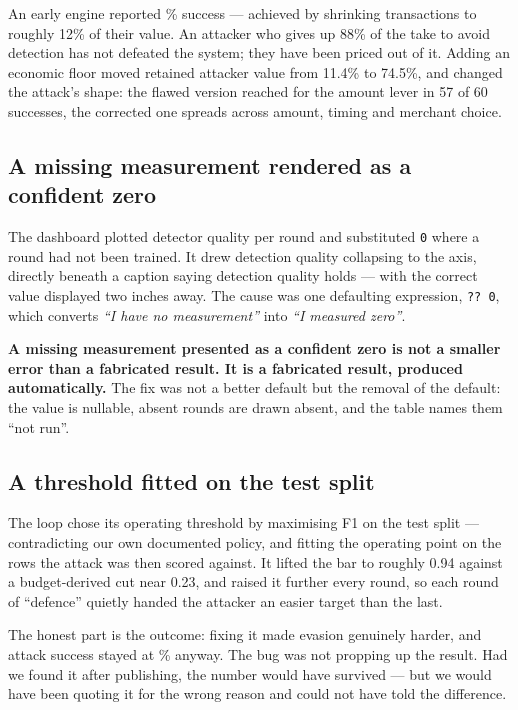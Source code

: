 \documentclass[11pt,a4paper]{article}
\newcommand{\claim}[1]{\textcolor{attack}{\textbf{#1}}}
\begin{document}
An early engine reported \AsrLast\% success --- achieved by shrinking transactions to roughly
12\% of their value. An attacker who gives up 88\% of the take to avoid detection has not
defeated the system; they have been priced out of it. Adding an economic floor moved
retained attacker value from 11.4\% to 74.5\%, and changed the attack's shape: the flawed
version reached for the amount lever in 57 of 60 successes, the corrected one spreads across
amount, timing and merchant choice.

\subsection{A missing measurement rendered as a confident zero}

The dashboard plotted detector quality per round and substituted \texttt{0} where a round had
not been trained. It drew detection quality collapsing to the axis, directly beneath a caption
saying detection quality holds --- with the correct value displayed two inches away. The cause
was one defaulting expression, \texttt{?? 0}, which converts \emph{``I have no measurement''}
into \emph{``I measured zero''}.

\claim{A missing measurement presented as a confident zero is not a smaller error than a
fabricated result. It is a fabricated result, produced automatically.} The fix was not a
better default but the removal of the default: the value is nullable, absent rounds are drawn
absent, and the table names them ``not run''.

\subsection{A threshold fitted on the test split}

The loop chose its operating threshold by maximising F1 on the test split --- contradicting
our own documented policy, and fitting the operating point on the rows the attack was then
scored against. It lifted the bar to roughly 0.94 against a budget-derived cut near 0.23, and
raised it further every round, so each round of ``defence'' quietly handed the attacker an
easier target than the last.

The honest part is the outcome: fixing it made evasion genuinely harder, and attack success
stayed at \AsrLast\% anyway. The bug was not propping up the result. Had we found it after
publishing, the number would have survived --- but we would have been quoting it for the
wrong reason and could not have told the difference.
\end{document}
